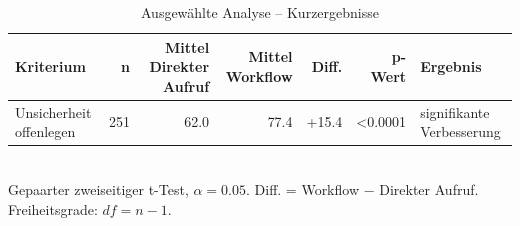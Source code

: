 \begin{table}[htbp]
\centering
\caption{Ausgewählte Analyse -- Kurzergebnisse}
\begin{tabular}{lrrrrrl}
\toprule
Kriterium & n & Mittel Direkter Aufruf & Mittel Workflow & Diff. & p-Wert & Ergebnis \\
\midrule
Unsicherheit offenlegen & 251 & 62.0 & 77.4 & +15.4 & <0.0001 & signifikante Verbesserung \\
\bottomrule
\end{tabular}
\\[2mm]
\footnotesize Gepaarter zweiseitiger t-Test, $\alpha=0.05$. Diff. = Workflow $-$ Direkter Aufruf. Freiheitsgrade: $df=n-1$.
\end{table}
